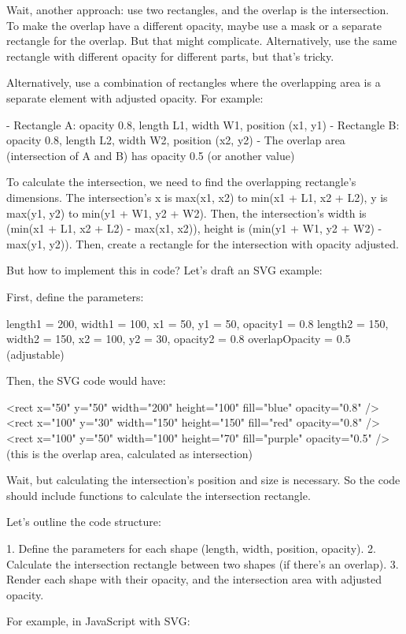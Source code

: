Wait, another approach: use two rectangles, and the overlap is the intersection. To make the overlap have a different opacity, maybe use a mask or a separate rectangle for the overlap. But that might complicate. Alternatively, use the same rectangle with different opacity for different parts, but that's tricky.

Alternatively, use a combination of rectangles where the overlapping area is a separate element with adjusted opacity. For example:

- Rectangle A: opacity 0.8, length L1, width W1, position (x1, y1)
- Rectangle B: opacity 0.8, length L2, width W2, position (x2, y2)
- The overlap area (intersection of A and B) has opacity 0.5 (or another value)

To calculate the intersection, we need to find the overlapping rectangle's dimensions. The intersection's x is max(x1, x2) to min(x1 + L1, x2 + L2), y is max(y1, y2) to min(y1 + W1, y2 + W2). Then, the intersection's width is (min(x1 + L1, x2 + L2) - max(x1, x2)), height is (min(y1 + W1, y2 + W2) - max(y1, y2)). Then, create a rectangle for the intersection with opacity adjusted.

But how to implement this in code? Let's draft an SVG example:

First, define the parameters:

length1 = 200, width1 = 100, x1 = 50, y1 = 50, opacity1 = 0.8
length2 = 150, width2 = 150, x2 = 100, y2 = 30, opacity2 = 0.8
overlapOpacity = 0.5 (adjustable)

Then, the SVG code would have:

<rect x="50" y="50" width="200" height="100" fill="blue" opacity="0.8" />
<rect x="100" y="30" width="150" height="150" fill="red" opacity="0.8" />
<rect x="100" y="50" width="100" height="70" fill="purple" opacity="0.5" /> (this is the overlap area, calculated as intersection)

Wait, but calculating the intersection's position and size is necessary. So the code should include functions to calculate the intersection rectangle.

Let's outline the code structure:

1. Define the parameters for each shape (length, width, position, opacity).
2. Calculate the intersection rectangle between two shapes (if there's an overlap).
3. Render each shape with their opacity, and the intersection area with adjusted opacity.

For example, in JavaScript with SVG:


